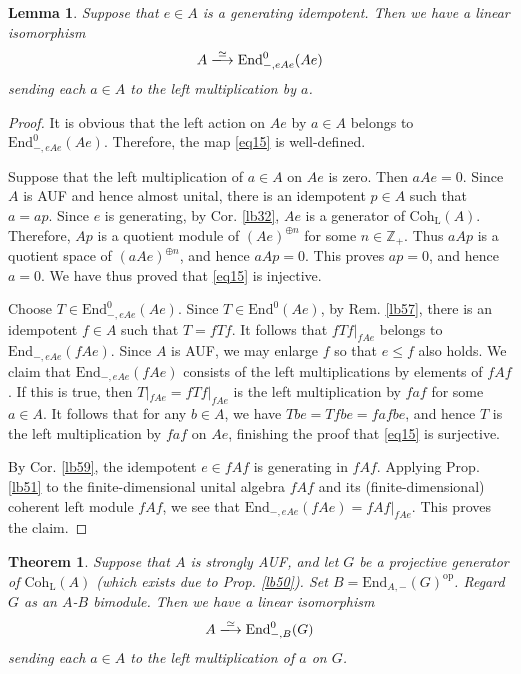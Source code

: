 \documentclass[11pt,b5paper,notitlepage]{article}
\theoremstyle{definition}
\theoremstyle{plain}
\newtheorem{thm}[df]{Theorem}
\newtheorem{lm}[df]{Lemma}
\newcommand{\End}{\mathrm{End}} %
\newcommand{\opp}{\mathrm{op}}
\newcommand{\Zbb}{\mathbb Z}
\newcommand{\Coh}{\mathrm{Coh}_{\mathrm L}}
\numberwithin{equation}{section}
\begin{document}
\begin{lm}\label{lb54}
Suppose that $e\in A$ is a generating idempotent. Then we have a linear isomorphism
\begin{align}\label{eq15}
A\xlongrightarrow{\simeq}\End_{-,eAe}^0(Ae)
\end{align}
sending each $a\in A$ to the left multiplication by $a$.
\end{lm}


\begin{proof}
It is obvious that the left action on $Ae$ by $a\in A$ belongs to $\End^0_{-,eAe}(Ae)$. Therefore, the map \eqref{eq15} is well-defined.

Suppose that the left multiplication of $a\in A$ on $Ae$ is zero. Then $aAe=0$. Since $A$ is AUF and hence almost unital, there is an idempotent $p\in A$ such that $a=ap$. Since $e$ is generating, by Cor. \ref{lb32}, $Ae$ is a generator of $\Coh(A)$. Therefore, $Ap$ is a quotient module of $(Ae)^{\oplus n}$ for some $n\in\Zbb_+$. Thus $aAp$ is a quotient space of $(aAe)^{\oplus n}$, and hence $aAp=0$. This proves $ap=0$, and hence $a=0$. We have thus proved that \eqref{eq15} is injective.


Choose $T\in \End_{-,eAe}^0(Ae)$. Since $T\in\End^0(Ae)$, by Rem. \ref{lb57}, there is an idempotent $f\in A$ such that $T=fTf$. It follows that $fTf|_{fAe}$ belongs to $\End_{-,eAe}(fAe)$. Since $A$ is AUF, we may enlarge $f$ so that $e\leq f$ also holds. We claim that $\End_{-,eAe}(fAe)$ consists of the left multiplications by elements of $fAf$. If this is true, then $T|_{fAe}=fTf|_{fAe}$ is the left multiplication by $faf$ for some $a\in A$. It follows that for any $b\in A$, we have $Tbe=Tfbe=fafbe$, and hence $T$ is the left multiplication by $faf$ on $Ae$, finishing the proof that \eqref{eq15} is surjective. 

By Cor. \ref{lb59}, the idempotent $e\in fAf$ is generating in $fAf$. Applying Prop. \ref{lb51} to the finite-dimensional unital algebra $fAf$ and its (finite-dimensional) coherent left module $fAf$, we see that $\End_{-,eAe}(fAe)=fAf|_{fAe}$. This proves the claim.
\end{proof}


\begin{thm}\label{lb61}
Suppose that $A$ is strongly AUF, and let $G$ be a projective generator of $\Coh(A)$ (which exists due to Prop. \ref{lb50}). Set $B=\End_{A,-}(G)^\opp$. Regard $G$ as an $A$-$B$ bimodule. Then we have a linear isomorphism
\begin{align}\label{eq16}
A\xlongrightarrow{\simeq}\End^0_{-,B}(G)
\end{align}
sending each $a\in A$ to the left multiplication of $a$ on $G$.
\end{thm}
\end{document}
